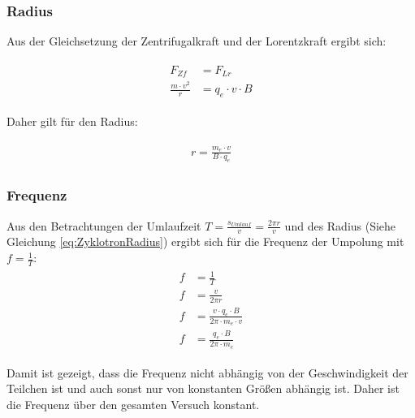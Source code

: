 \subsubsection{Radius}

Aus der Gleichsetzung der Zentrifugalkraft und der Lorentzkraft ergibt sich: 

\begin{align}
\begin{split}
	F_{Zf} &= F_{Lr} \\
	\frac{m \cdot v^2}{r} &= q_e \cdot v \cdot B
\end{split}
\end{align}

\noindent Daher gilt für den Radius:

\begin{align} \label{eq:ZyklotronRadius}
\begin{split}
	r = \frac{m_e \cdot v}{B \cdot q_e}
\end{split}
\end{align}


\subsubsection{Frequenz}

Aus den Betrachtungen der Umlaufzeit $T = \frac{s_{Umlauf}}{v} = \frac{2 \pi r}{v}$ und des Radius (Siehe Gleichung \ref{eq:ZyklotronRadius}) ergibt sich für die Frequenz der Umpolung mit $f=\frac{1}{T}$: \\

\begin{align}
\begin{split}
	f &= \frac{1}{T} \\
	f &= \frac{v}{2 \pi r} \\
	f &= \frac{v \cdot q_e \cdot B}{2 \pi \cdot m_e \cdot v} \\
	f &= \frac{q_e \cdot B}{2 \pi \cdot m_e}
\end{split}
\end{align}

\noindent Damit ist gezeigt, dass die Frequenz nicht abhängig von der Geschwindigkeit der Teilchen ist und auch sonst nur von konstanten Größen abhängig ist. Daher ist die Frequenz über den gesamten Versuch konstant.




